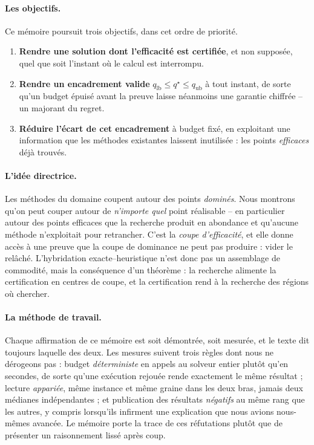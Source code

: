 \documentclass[11pt,a4paper]{article}
\theoremstyle{plain}
\theoremstyle{remark}
\newcommand{\qs}{q^{\star}}
\begin{document}
\paragraph{Les objectifs.} Ce mémoire poursuit trois objectifs, dans cet
ordre de priorité.
\begin{enumerate}[label=(O\arabic*),leftmargin=3em]
\item \textbf{Rendre une solution dont l'efficacité est certifiée}, et non
  supposée, quel que soit l'instant où le calcul est interrompu.
\item \textbf{Rendre un encadrement valide} $q_{\text{lb}}\le\qs\le
  q_{\text{ub}}$ à tout instant, de sorte qu'un budget épuisé avant la
  preuve laisse néanmoins une garantie chiffrée -- un majorant du regret.
\item \textbf{Réduire l'écart de cet encadrement} à budget fixé, en
  exploitant une information que les méthodes existantes laissent
  inutilisée : les points \emph{efficaces} déjà trouvés.
\end{enumerate}

\paragraph{L'idée directrice.} Les méthodes du domaine coupent autour des
points \emph{dominés}. Nous montrons qu'on peut couper autour de
\emph{n'importe quel} point réalisable -- en particulier autour des points
efficaces que la recherche produit en abondance et qu'aucune méthode
n'exploitait pour retrancher. C'est la \emph{coupe d'efficacité}, et elle
donne accès à une preuve que la coupe de dominance ne peut pas produire :
vider le relâché. L'hybridation exacte--heuristique n'est donc pas un
assemblage de commodité, mais la conséquence d'un théorème : la recherche
alimente la certification en centres de coupe, et la certification rend à
la recherche des régions où chercher.

\paragraph{La méthode de travail.} Chaque affirmation de ce mémoire est
soit démontrée, soit mesurée, et le texte dit toujours laquelle des deux.
Les mesures suivent trois règles dont nous ne dérogeons pas : budget
\emph{déterministe} en appels au solveur entier plutôt qu'en secondes, de
sorte qu'une exécution rejouée rende exactement le même résultat ; lecture
\emph{appariée}, même instance et même graine dans les deux bras, jamais
deux médianes indépendantes ; et publication des résultats \emph{négatifs}
au même rang que les autres, y compris lorsqu'ils infirment une explication
que nous avions nous-mêmes avancée. Le mémoire porte la trace de ces
réfutations plutôt que de présenter un raisonnement lissé après coup.
\end{document}
